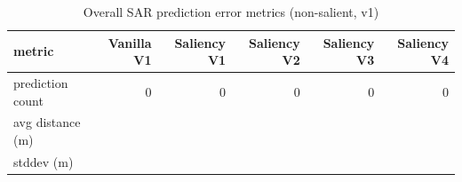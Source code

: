 \begin{table}[ht]
\centering
\caption{Overall SAR prediction error metrics (non-salient, v1)}
\label{tab:sar-overall-errors-non-salient,-v1}
\begin{tabular}{lrrrrr}
\hline
metric & Vanilla V1 & Saliency V1 & Saliency V2 & Saliency V3 & Saliency V4 \\
\hline
prediction count & 0 & 0 & 0 & 0 & 0 \\
avg distance (m) &  &  &  &  &  \\
stddev (m) &  &  &  &  &  \\
\hline
\end{tabular}
\end{table}
